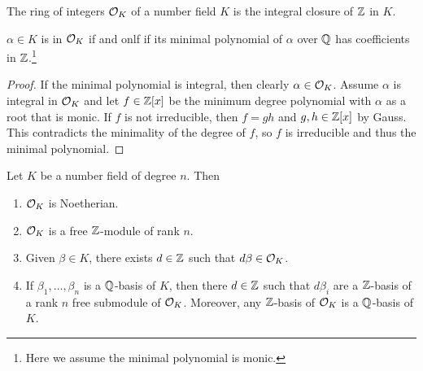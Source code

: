 \documentclass[10pt, twoside]{article}
\begin{document}
        \begin{defn}
            The ring of integers $\mathcal{O}_K$ of a number field $K$ is the integral closure of $\mathbb{Z}$ in $K$.
        \end{defn}

        \begin{prop}
            $\alpha \in K$ is in $\mathcal{O}_K$ if and onlf if its minimal polynomial of $\alpha$ over $\mathbb{Q}$ has coefficients in $\mathbb{Z}$.\footnote{Here we assume the minimal polynomial is monic.}
            \begin{proof}
                If the minimal polynomial is integral, then clearly $\alpha \in \mathcal{O}_K$. Assume $\alpha$ is integral in $\mathcal{O}_K$ and let $f \in \mathbb{Z}[x]$ be the minimum degree polynomial with $\alpha$ as a root that is monic. If $f$ is not irreducible, then $f = gh$ and $g,h \in \mathbb{Z}[x]$ by Gauss. This contradicts the minimality of the degree of $f$, so $f$ is irreducible and thus the minimal polynomial.
            \end{proof}
        \end{prop}

        \begin{thm}
            Let $K$ be a number field of degree $n$. Then
            \begin{enumerate}
                \item $\mathcal{O}_K$ is Noetherian.
                \item $\mathcal{O}_K$ is a free $\mathbb{Z}$-module of rank $n$.
                \item Given $\beta \in K$, there exists $d \in \mathbb{Z}$ such that $d \beta \in \mathcal{O}_K$.
                \item If $\beta_1, \ldots, \beta_n$ is a $\mathbb{Q}$-basis of $K$, then there $d \in \mathbb{Z}$ such that $d\beta_i$ are a $\mathbb{Z}$-basis of a rank $n$ free submodule of $\mathcal{O}_K$. Moreover, any $\mathbb{Z}$-basis of $\mathcal{O}_K$ is a $\mathbb{Q}$-basis of $K$.
            \end{enumerate}
        \end{thm}
\end{document}
